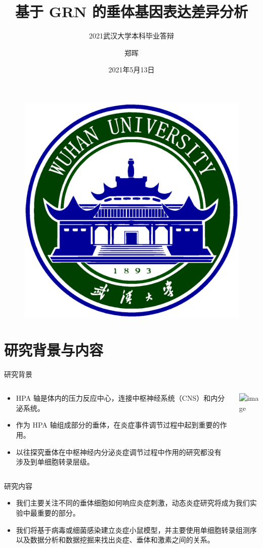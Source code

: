 \documentclass{beamer}
\author{郑晖}
\title{基于 GRN 的垂体基因表达差异分析}
\subtitle{2021武汉大学本科毕业答辩}
\institute{武汉大学弘毅学堂}
\date{2021年5月13日}
\begin{document}
\kaishu
\begin{frame}
  \titlepage
  \begin{figure}[htpb]
    \begin{center}
      \includegraphics[width=0.2\linewidth]{logo/whu.eps}
    \end{center}
  \end{figure}
\end{frame}

\begin{frame}
  \tableofcontents[sectionstyle=show,subsectionstyle=show/shaded/hide,subsubsectionstyle=show/shaded/hide]
\end{frame}


\section{研究背景与内容}

\begin{frame}{研究背景}
  \begin{columns}
    \begin{column}{.5\linewidth}
      \begin{itemize}
        \item HPA 轴是体内的压力反应中心，连接中枢神经系统（CNS）和内分泌系统。
        \item 作为 HPA 轴组成部分的垂体，在炎症事件调节过程中起到重要的作用。
        \item 以往探究垂体在中枢神经内分泌炎症调节过程中作用的研究都没有涉及到单细胞转录层级。
      \end{itemize}
    \end{column}
 
    \begin{column}{.5\linewidth}
      \includegraphics<1>[width=\linewidth]{figs/HPA.png}
    \end{column}
  \end{columns}
\end{frame}

\begin{frame}{研究内容}
  \begin{itemize}
    \item 我们主要关注不同的垂体细胞如何响应炎症刺激，动态炎症研究将成为我们实验中最重要的部分。
    \item 我们将基于病毒或细菌感染建立炎症小鼠模型，并主要使用单细胞转录组测序以及数据分析和数据挖掘来找出炎症、垂体和激素之间的关系。
  \end{itemize}
\end{frame}
\end{document}
